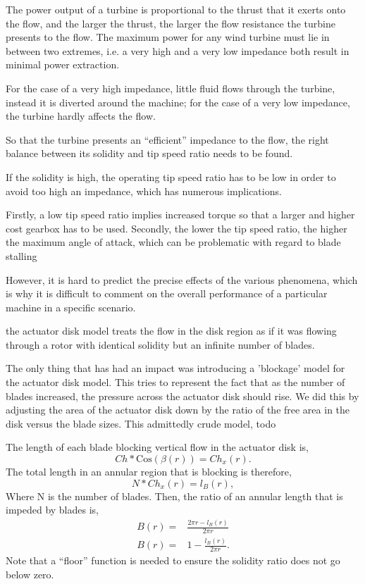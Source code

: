 The power output of a turbine is proportional to the thrust that it
exerts onto the flow, and the larger the thrust, the larger the flow
resistance the turbine presents to the flow. The maximum power for any
wind turbine must lie in between two extremes, i.e. a very high and
a very low impedance both result in minimal power
extraction\cite{solidity_oxford}.  

For the case of a very high impedance, little fluid flows through the
turbine, instead it is diverted around the machine; for the case of a
very low impedance, the turbine hardly affects the flow.

So that the turbine presents an ``efficient'' impedance to the flow, the 
right balance between its solidity and tip speed ratio needs to be found.

If the solidity is high, the operating tip speed ratio has to be low in
order to avoid too high an impedance, which has numerous implications. 

Firstly, a low tip speed ratio implies increased torque so that a larger
and higher cost gearbox has to be used. Secondly, the lower the tip
speed ratio, the higher the maximum angle of attack, which can be
problematic with regard to blade stalling

However, it is hard to predict the precise effects of the various
phenomena, which is why it is difficult to comment on the overall
performance of a particular machine in a specific
scenario. 


the actuator
disk model treats the flow in the disk region as if it was flowing
through a rotor with identical solidity but an infinite number of
blades. 

The only thing that has had an impact was introducing a 'blockage' model
for the actuator disk model. This tries to represent the fact that as
the number of blades increased, the pressure across the actuator disk
should rise. We did this by adjusting the area of the actuator disk down
by the ratio of the free area in the disk versus the blade sizes. 
This admittedly crude model, todo

The length of each blade blocking vertical flow in the actuator disk is, 
\begin{equation}
  Ch * \text{Cos}(\beta(r)) = Ch_x(r). 
\end{equation}
The total length in an annular region that is blocking is therefore,
\begin{equation}
  N * Ch_x(r) = l_B(r),
\end{equation}
Where N is the number of blades. 
Then, the ratio of an annular length that is impeded by blades is, 
\begin{eqnarray}
 B(r) =& \frac{2\pi r- l_B(r)}{2 \pi r}\\
 B(r) =& 1- \frac{l_B(r)}{2 \pi r}. 
\end{eqnarray}
Note that a ``floor'' function is needed to ensure the solidity ratio
does not go below zero. 


